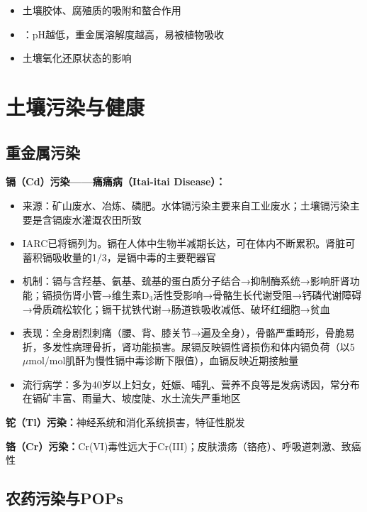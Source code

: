 \documentclass[10pt,a4paper,oneside]{ctexbook}
\begin{document}
\begin{itemize}[leftmargin=*]
    \item 土壤胶体、腐殖质的吸附和螯合作用
    \item {}：pH越低，重金属溶解度越高，易被植物吸收
    \item 土壤氧化还原状态的影响
\end{itemize}

\section{土壤污染与健康}

\subsection{重金属污染}

\begin{keybox}
\textbf{镉（Cd）污染——痛痛病（Itai-itai Disease）：}
\begin{itemize}[leftmargin=*]
    \item 来源：矿山废水、冶炼、磷肥。水体镉污染主要来自工业废水；土壤镉污染主要是含镉废水灌溉农田所致
    \item IARC已将镉列为。镉在人体中生物半减期长达，可在体内不断累积。肾脏可蓄积镉吸收量的1/3，是镉中毒的主要靶器官
    \item 机制：镉与含羟基、氨基、巯基的蛋白质分子结合→抑制酶系统→影响肝肾功能；镉损伤肾小管→维生素D$_3$活性受影响→骨骼生长代谢受阻→钙磷代谢障碍→骨质疏松软化；镉干扰铁代谢→肠道铁吸收减低、破坏红细胞→贫血
    \item 表现：全身剧烈刺痛（腰、背、膝关节→遍及全身），骨骼严重畸形，骨脆易折，多发性病理骨折，肾功能损害。尿镉反映镉性肾损伤和体内镉负荷（以5 $\mu$mol/mol肌酐为慢性镉中毒诊断下限值），血镉反映近期接触量
    \item 流行病学：多为40岁以上妇女，妊娠、哺乳、营养不良等是发病诱因，常分布在镉矿丰富、雨量大、坡度陡、水土流失严重地区
\end{itemize}

\textbf{铊（Tl）污染：}神经系统和消化系统损害，特征性脱发

\textbf{铬（Cr）污染：}Cr(VI)毒性远大于Cr(III)；皮肤溃疡（铬疮）、呼吸道刺激、致癌性
\end{keybox}

\subsection{农药污染与POPs}
\end{document}
